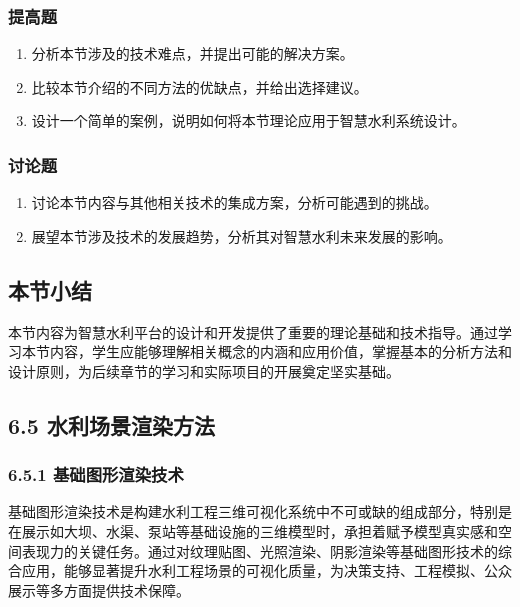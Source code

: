 \subsubsection{提高题}\label{ux63d0ux9ad8ux9898-5}

\begin{enumerate}
\def\labelenumi{\arabic{enumi}.}
\setcounter{enumi}{3}
\tightlist
\item
  分析本节涉及的技术难点，并提出可能的解决方案。
\item
  比较本节介绍的不同方法的优缺点，并给出选择建议。
\item
  设计一个简单的案例，说明如何将本节理论应用于智慧水利系统设计。
\end{enumerate}

\subsubsection{讨论题}\label{ux8ba8ux8bbaux9898-5}

\begin{enumerate}
\def\labelenumi{\arabic{enumi}.}
\setcounter{enumi}{6}
\tightlist
\item
  讨论本节内容与其他相关技术的集成方案，分析可能遇到的挑战。
\item
  展望本节涉及技术的发展趋势，分析其对智慧水利未来发展的影响。
\end{enumerate}

\subsection{本节小结}\label{ux672cux8282ux5c0fux7ed3-4}

本节内容为智慧水利平台的设计和开发提供了重要的理论基础和技术指导。通过学习本节内容，学生应能够理解相关概念的内涵和应用价值，掌握基本的分析方法和设计原则，为后续章节的学习和实际项目的开展奠定坚实基础。

\subsection{6.5 水利场景渲染方法}\label{ux6c34ux5229ux573aux666fux6e32ux67d3ux65b9ux6cd5}

\subsubsection{6.5.1 基础图形渲染技术}\label{ux57faux7840ux56feux5f62ux6e32ux67d3ux6280ux672f}

基础图形渲染技术是构建水利工程三维可视化系统中不可或缺的组成部分，特别是在展示如大坝、水渠、泵站等基础设施的三维模型时，承担着赋予模型真实感和空间表现力的关键任务。通过对纹理贴图、光照渲染、阴影渲染等基础图形技术的综合应用，能够显著提升水利工程场景的可视化质量，为决策支持、工程模拟、公众展示等多方面提供技术保障。

